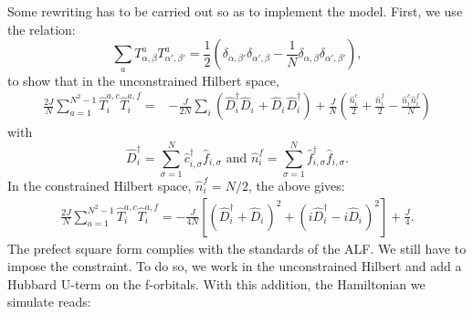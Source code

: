 Some  rewriting has to be carried out so as to implement  the model.   First, we  use the  relation:
\begin{equation*}
	\sum_{a} T^{a}_{\alpha,\beta} T^{a}_{\alpha',\beta'} = \frac{1}{2} \left(  \delta_{\alpha,\beta'}  \delta_{\alpha',\beta} - \frac{1}{N} \delta_{\alpha,\beta} \delta_{\alpha', \beta'} \right), 
\end{equation*}
to  show that  in the unconstrained Hilbert space,
\begin{align}
	 \frac{2 J}{N} \sum_{ a=1  }^{N^2 -1}  \hat{T}^{a,c}_{i}  \hat{T}^{a,f}_{i}   = &   - \frac{J}{2N} \sum_{i}  \left( 
                \hat{D}^{\dagger}_{i} \hat{D}^{\phantom\dagger}_{i}   +    \hat{D}^{\phantom\dagger}_{i} \hat{D}^{\dagger}_{i}    \right)    + \frac{J}{N}   \left(   \frac{\hat{n}^{c}_i}{2}  + \frac{\hat{n}^{f}_i}{2} -  \frac{\hat{n}^{c}_i \hat{n}^{f}_i}{N}   \right) \nonumber 
 \end{align}
with
\begin{equation*}
	   \hat{D}^{\dagger}_{i}   =  \sum_{\sigma=1}^{N} \hat{c}^{\dagger}_{i,\sigma}  \hat{f}^{\phantom\dagger}_{i,\sigma}   \text{  and  }   \hat{n}^{f}_i =   \sum_{\sigma=1}^{N}    \hat{f}^{\dagger}_{i,\sigma}   \hat{f}^{\phantom\dagger}_{i,\sigma}.
\end{equation*}
In the constrained Hilbert space, $\hat{n}^{f}_i = N/2 $, the above gives:
\begin{align}
	 \frac{2 J}{N} \sum_{ a=1  }^{N^2 -1}  \hat{T}^{a,c}_{i}  \hat{T}^{a,f}_{i}   =     -  \frac{J}{4N}    \left[ \left(   \hat{D}^{\dagger}_{i}  + \hat{D}^{\phantom\dagger}_{i}    \right)^{2}  + 
                                                       \left(  i\hat{D}^{\dagger}_{i}  - i  \hat{D}^{\phantom\dagger}_{i}    \right)^2  \right] + \frac{J}{4}.  
 \end{align}
The  prefect square form  complies with the standards of the ALF.      We still have to impose the constraint. To do so, we   work in the unconstrained Hilbert  and add a Hubbard  U-term on  the f-orbitals.    With this addition, the Hamiltonian we simulate reads: 

